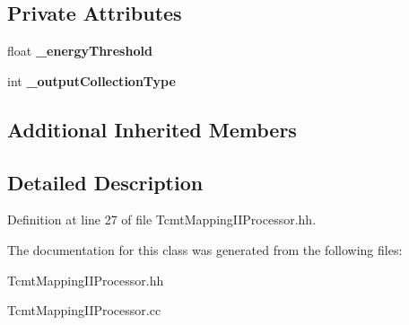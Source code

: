\subsection*{Private Attributes}
\begin{DoxyCompactItemize}
\item 
float {\bfseries \-\_\-energy\-Threshold}\label{classCALICE_1_1TcmtMappingIIProcessor_acf3598b6f599e7ec7c691b0995c86ca0}

\item 
int {\bfseries \-\_\-output\-Collection\-Type}\label{classCALICE_1_1TcmtMappingIIProcessor_ad941439d1f231ec3ea9ca0cfdd25c142}

\end{DoxyCompactItemize}
\subsection*{Additional Inherited Members}


\subsection{Detailed Description}


Definition at line 27 of file Tcmt\-Mapping\-I\-I\-Processor.\-hh.



The documentation for this class was generated from the following files\-:\begin{DoxyCompactItemize}
\item 
Tcmt\-Mapping\-I\-I\-Processor.\-hh\item 
Tcmt\-Mapping\-I\-I\-Processor.\-cc\end{DoxyCompactItemize}
